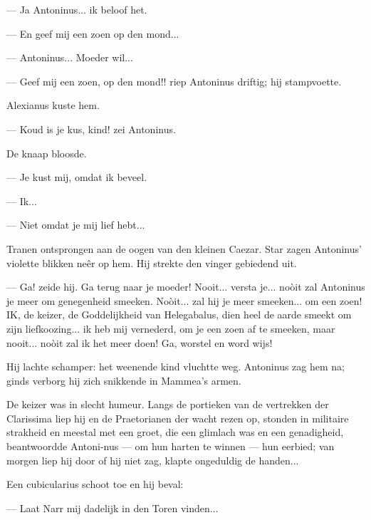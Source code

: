\documentclass[a4paper, 12pt, oneside, dutch]{article}
\begin{document}
--- Ja Antoninus... ik beloof het.

--- En geef mij een zoen op den mond...

--- Antoninus... Moeder wil...

--- Geef mij een zoen, op den mond!! riep Antoninus driftig; hij stampvoette.

Alexianus kuste hem.

--- Koud is je kus, kind! zei Antoninus.

De knaap bloosde.

--- Je kust mij, omdat ik beveel.

--- Ik...

--- Niet omdat je mij lief hebt...

Tranen ontsprongen aan de oogen van den kleinen Caezar. Star zagen Antoninus' violette blikken neêr op hem. Hij strekte den vinger gebiedend uit.

--- Ga! zeide hij. Ga terug naar je moeder! Nooit... versta je... noòit zal Antoninus je meer om genegenheid smeeken. Noòit... zal hij je meer smeeken... om een zoen! IK, de keizer, de Goddelijkheid van Helegabalus, dien heel de aarde smeekt om zijn liefkoozing... ik heb mij vernederd, om je een zoen af te smeeken, maar nooit... noòit zal ik het meer doen! Ga, worstel en word wijs!

Hij lachte schamper: het weenende kind vluchtte weg. Antoninus zag hem na; ginds verborg hij zich snikkende in Mammea's armen.

De keizer was in slecht humeur. Langs de portieken van de vertrekken der Clarissima liep hij en de Praetorianen der wacht rezen op, stonden in militaire strakheid en meestal met een groet, die een glimlach was en een genadigheid, beantwoordde Antoni-nus --- om hun harten te winnen --- hun eerbied; van morgen liep hij door of hij niet zag, klapte ongeduldig de handen...

Een cubicularius schoot toe en hij beval:

--- Laat Narr mij dadelijk in den Toren vinden...
\end{document}
